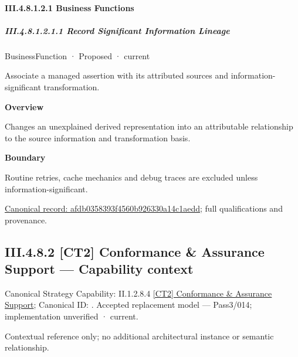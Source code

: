 \paragraph*{III.4.8.1.2.1 Business Functions}
\label{navigation:III.4.8.1.2.1}

\subparagraph*{III.4.8.1.2.1.1 Record Significant Information Lineage}
\label{navigation:III.4.8.1.2.1.1}

\label{element:afdb0358393f4560b926330a14c1aedd}
{\small BusinessFunction · Proposed · current}\par

Associate a managed assertion with its attributed sources and information-significant transformation.



\textbf{Overview}



Changes an unexplained derived representation into an attributable relationship to the source information and transformation basis.



\textbf{Boundary}



Routine retries, cache mechanics and debug traces are excluded unless information-significant.


{\footnotesize \href{../../../../../../../continuum/business/business-function/afdb0358393f4560b926330a14c1aedd.md}{Canonical record: afdb0358393f4560b926330a14c1aedd}; full qualifications and provenance.}\par
\subsection*{III.4.8.2 [CT2] Conformance \& Assurance Support — Capability context}
\label{navigation:III.4.8.2}

{\small Canonical Strategy Capability: II.1.2.8.4 \hyperref[element:131791faa80f408b8d566c601edd71be]{[CT2] Conformance \& Assurance Support}; Canonical ID: \texttt{}. Accepted replacement model — Pass3/014; implementation unverified · current.}\par
Contextual reference only; no additional architectural instance or semantic relationship.\par
